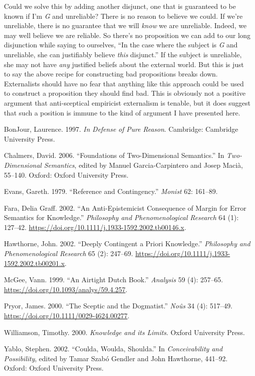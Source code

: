 \documentclass[
  11pt,
  letterpaper,
  DIV=11,
  numbers=noendperiod,
  oneside]{scrartcl}
\newlength{\cslhangindent}
\newenvironment{CSLReferences}[2] %
 {\begin{list}{}{%
  \setlength{\itemindent}{0pt}
  \setlength{\leftmargin}{0pt}
  \setlength{\parsep}{0pt}
  \ifodd #1
   \setlength{\leftmargin}{\cslhangindent}
   \setlength{\itemindent}{-1\cslhangindent}
  \fi
  \setlength{\itemsep}{#2\baselineskip}}}
 {\end{list}}
\begin{document}
Could we solve this by adding another disjunct, one that is guaranteed
to be known if I'm \emph{G} and unreliable? There is no reason to
believe we could. If we're unreliable, there is no guarantee that we
will \emph{know} we are unreliable. Indeed, we may well believe we are
reliable. So there's no proposition we can add to our long disjunction
while saying to ourselves, ``In the case where the subject is \emph{G}
and unreliable, she can justifiably believe \emph{this} disjunct.'' If
the subject is unreliable, she may not have \emph{any} justified beliefs
about the external world. But this is just to say the above recipe for
constructing bad propositions breaks down. Externalists should have no
fear that anything like this approach could be used to construct a
proposition they should find bad. This is obviously not a positive
argument that anti-sceptical empiricist externalism is tenable, but it
does suggest that such a position is immune to the kind of argument I
have presented here.

\label{refs}
\begin{CSLReferences}{1}{0}
BonJour, Laurence. 1997. \emph{In Defense of Pure Reason}. Cambridge:
Cambridge University Press.

Chalmers, David. 2006. {``Foundations of Two-Dimensional Semantics.''}
In \emph{Two-Dimensional Semantics}, edited by Manuel Garcia-Carpintero
and Josep Macià, 55--140. Oxford: Oxford University Press.

Evans, Gareth. 1979. {``Reference and Contingency.''} \emph{Monist} 62:
161--89.

Fara, Delia Graff. 2002. {``An Anti-Epistemicist Consequence of Margin
for Error Semantics for Knowledge.''} \emph{Philosophy and
Phenomenological Research} 64 (1): 127--42.
\url{https://doi.org/10.1111/j.1933-1592.2002.tb00146.x}.

Hawthorne, John. 2002. {``Deeply Contingent a Priori Knowledge.''}
\emph{Philosophy and Phenomenological Research} 65 (2): 247--69.
\url{https://doi.org/10.1111/j.1933-1592.2002.tb00201.x}.

McGee, Vann. 1999. {``An Airtight Dutch Book.''} \emph{Analysis} 59 (4):
257--65. \url{https://doi.org/10.1093/analys/59.4.257}.

Pryor, James. 2000. {``The Sceptic and the Dogmatist.''} \emph{No{û}s}
34 (4): 517--49. \url{https://doi.org/10.1111/0029-4624.00277}.

Williamson, Timothy. 2000. \emph{{Knowledge and its Limits}}. Oxford
University Press.

Yablo, Stephen. 2002. {``Coulda, Woulda, Shoulda.''} In
\emph{Conceivability and Possibility}, edited by Tamar Szabó Gendler and
John Hawthorne, 441--92. Oxford: Oxford University Press.

\end{CSLReferences}
\end{document}
